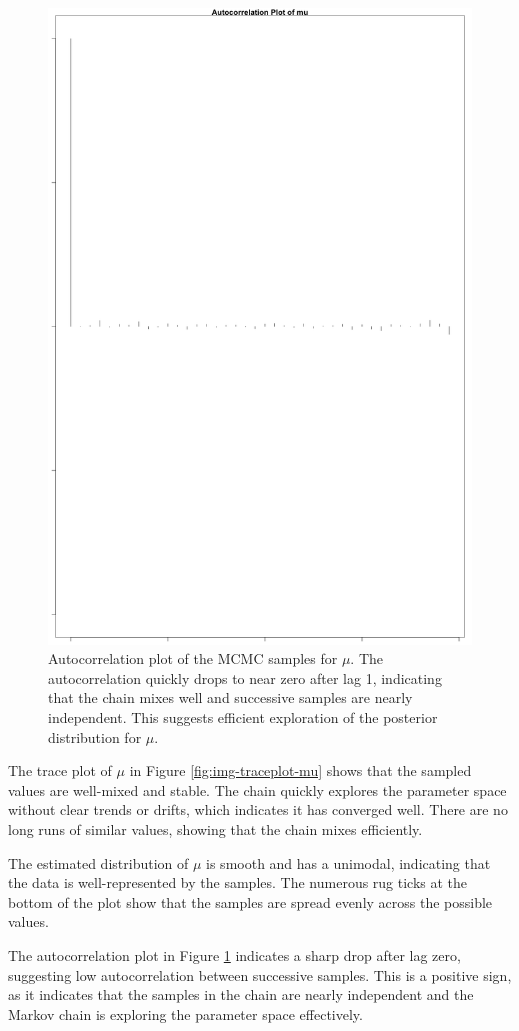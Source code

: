 \documentclass[]{article}
\begin{document}
\begin{figure}[H]
	\centering
	\includegraphics[width=0.7\linewidth]{img/img-autocorr-mu}
    \caption{Autocorrelation plot of the MCMC samples for $\mu$. The autocorrelation quickly drops to near zero after lag 1, indicating that the chain mixes well and successive samples are nearly independent. This suggests efficient exploration of the posterior distribution for $\mu$.}
	\label{fig:img-autocorr-mu}
\end{figure}


The trace plot of $\mu$ in Figure \ref{fig:img-traceplot-mu} shows that the sampled values are well-mixed and stable. The chain quickly explores the parameter space without clear trends or drifts, which indicates it has converged well. There are no long runs of similar values, showing that the chain mixes efficiently.

The estimated distribution of $\mu$ is smooth and has a unimodal, indicating that the data is well-represented by the samples. The numerous rug ticks at the bottom of the plot show that the samples are spread evenly across the possible values.

The autocorrelation plot in Figure \ref{fig:img-autocorr-mu} indicates a sharp drop after lag zero, suggesting low autocorrelation between successive samples. This is a positive sign, as it indicates that the samples in the chain are nearly independent and the Markov chain is exploring the parameter space effectively.
\end{document}
